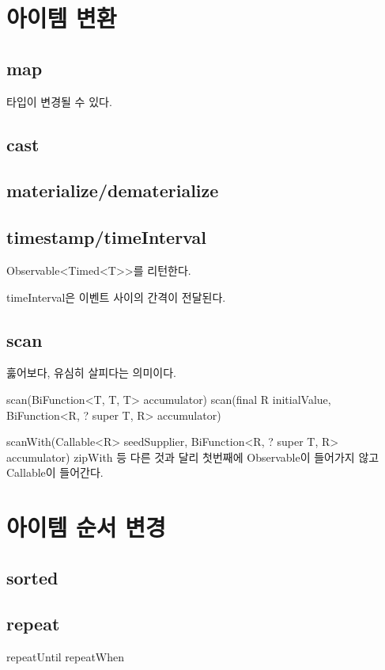 \documentclass{book}
\begin{document}
{\section{아이템 변환}
\subsection{map}
타입이 변경될 수 있다.



\subsection{cast}

\subsection{materialize/dematerialize}

\subsection{timestamp/timeInterval}
Observable<Timed<T>>를 리턴한다.

timeInterval은 이벤트 사이의 간격이 전달된다.

\subsection{scan}
훓어보다, 유심히 살피다는 의미이다.

scan(BiFunction<T, T, T> accumulator)
scan(final R initialValue, BiFunction<R, ? super T, R> accumulator)

scanWith(Callable<R> seedSupplier, BiFunction<R, ? super T, R> accumulator)
zipWith 등 다른 것과 달리 첫번째에 Observable이 들어가지 않고 Callable이 들어간다.

\section{아이템 순서 변경}
\subsection{sorted}





\subsection{repeat}
repeatUntil
repeatWhen


}
\end{document}
